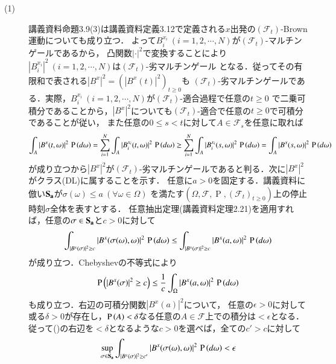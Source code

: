\begin{prf}
\begin{description}\mbox{}
	\item[(1)] 講義資料命題3.9(3)は講義資料定義3.12で定義される$x$出発の$(\mathcal{F}_t)$-Brown運動についても成り立つ．
		よって$B_i^{x_i}\ (i = 1,2,\cdots,N)$が$(\mathcal{F}_t)$-マルチンゲールであるから，
		凸関数$|\cdot|^2$で変換することにより$\left|B_i^{x_i}\right|^2\ (i = 1,2,\cdots,N)$は$(\mathcal{F}_t)$-劣マルチンゲール
		となる．従ってその有限和で表される$|B^x|^2 = \left(\left|B^x(t)\right|^2\right)_{t \geq 0}$も
		$(\mathcal{F}_t)$-劣マルチンゲールである．実際，$B_i^{x_i}\ (i = 1,2,\cdots,N)$が$(\mathcal{F}_t)$-適合過程で任意の$t \geq 0$
		で二乗可積分であることから，$|B^x|^2$についても$(\mathcal{F}_t)$-適合で任意の$t \geq 0$で可積分であることが従い，
		また任意の$0 \leq s < t$に対して$A \in \mathcal{F}_s$を任意に取れば
		\begin{align}
			\int_{A} |B^x(t,\omega)|^2\, \operatorname{P} \left(d\omega\right) 
			= \sum_{i=1}^{N} \int_{A} |B_i^{x_i}(t,\omega)|^2\, \operatorname{P} \left(d\omega\right) 
			\geq \sum_{i=1}^{N} \int_{A} |B_i^{x_i}(s,\omega)|^2\, \operatorname{P} \left(d\omega\right) 
			= \int_{A} |B^x(s,\omega)|^2\, \operatorname{P} \left(d\omega\right) 
		\end{align}
		が成り立つから$|B^x|^2$が$(\mathcal{F}_t)$-劣マルチンゲールであると判る．次に$|B^x|^2$がクラス(DL)に属することを示す．
		任意に$a > 0$を固定する．講義資料に倣い$\bf{S}_a$が$\sigma(\omega) \leq a\ (\forall \omega \in \Omega)$
		を満たす$(\Omega, \mathcal{F}, \operatorname{P}, (\mathcal{F}_t)_{t \geq 0})$上の停止時刻$\sigma$全体を表すとする．
		任意抽出定理(講義資料定理2.21)を適用すれば，任意の$\sigma \in \bf{S}_a$と$c > 0$に対して
		\begin{align}
			\int_{|B^x(\sigma)|^2 \geq c} |B^x(\sigma(\omega), \omega)|^2\, \operatorname{P} \left(d\omega\right)
			\leq \int_{|B^x(\sigma)|^2 \geq c} |B^x(a, \omega)|^2\, \operatorname{P} \left(d\omega\right)
		\end{align}
		が成り立つ．Chebyshevの不等式により
		\begin{align}
			\operatorname{P} \left(|B^x(\sigma)|^2 \geq c\right) \leq \frac{1}{c} \int_{\Omega} |B^x(a, \omega)|^2\, \operatorname{P} \left(d\omega\right) \label{eq:stoc_report_Q2}
		\end{align}
		も成り立つ．右辺の可積分関数$|B^x(a)|^2$について，
		任意の$\epsilon > 0$に対して或る$\delta > 0$が存在し，$\operatorname{P} \left(A\right) < \delta$なる任意の$A \in \mathcal{F}$上での積分は$< \epsilon$となる．
		従って()の右辺を$ < \delta$となるような$c > 0$を選べば，全ての$c' > c$に対して
		\begin{align}
			\sup{\sigma \in \bf{S}_a}{\int_{|B^x(\sigma)|^2 \geq c'} |B^x(\sigma(\omega), \omega)|^2\, \prob{d\omega}} < \epsilon

\end{align}
\end{description}
\end{prf}

